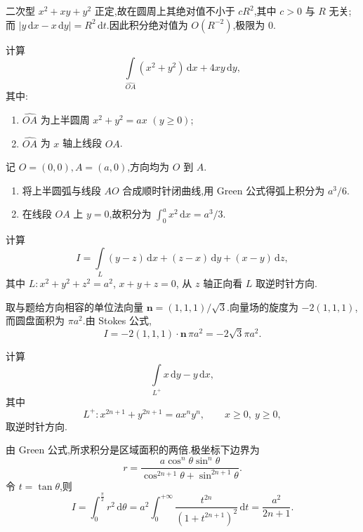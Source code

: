 \begin{solution}
    二次型 $x^2+xy+y^2$ 正定,故在圆周上其绝对值不小于 $cR^2$,其中 $c>0$ 与 $R$ 无关;而 $|y\,\mathrm{d}x-x\,\mathrm{d}y|=R^2\,\mathrm{d}t$.因此积分绝对值为 $O(R^{-2})$,极限为 $0$.
\end{solution}

\begin{example}
    计算
    \[
        \int\limits_{\widehat{OA}}(x^2+y^2)\,\mathrm{d}x+4xy\,\mathrm{d}y,
    \]
    其中:
    \begin{enumerate}
        \item $\widehat{OA}$ 为上半圆周 $x^2+y^2=ax$ $(y\geq0)$;
        \item $\widehat{OA}$ 为 $x$ 轴上线段 $OA$.
    \end{enumerate}
\end{example}
\exampleblank

\begin{solution}
    记 $O=(0,0),A=(a,0)$,方向均为 $O$ 到 $A$.
    \begin{enumerate}
        \item 将上半圆弧与线段 $AO$ 合成顺时针闭曲线,用 Green 公式得弧上积分为 $a^3/6$.
        \item 在线段 $OA$ 上 $y=0$,故积分为 $\int_0^ax^2\,\mathrm{d}x=a^3/3$.
    \end{enumerate}
\end{solution}

\begin{example}
    计算
    \[
        I=\int\limits_L(y-z)\,\mathrm{d}x+(z-x)\,\mathrm{d}y+(x-y)\,\mathrm{d}z,
    \]
    其中 $L:x^2+y^2+z^2=a^2$, $x+y+z=0$, 从 $z$ 轴正向看 $L$ 取逆时针方向.
\end{example}
\exampleblank

\begin{solution}
    取与题给方向相容的单位法向量 $\bm n=(1,1,1)/\sqrt{3}$.向量场的旋度为 $-2(1,1,1)$,而圆盘面积为 $\pi a^2$.由 Stokes 公式,
    \[
        I=-2(1,1,1)\cdot\bm n\,\pi a^2=-2\sqrt{3}\pi a^2.
    \]
\end{solution}

\begin{example}
    计算
    \[
        \int\limits_{L^+}x\,\mathrm{d}y-y\,\mathrm{d}x,
    \]
    其中
    \[
        L^+:x^{2n+1}+y^{2n+1}=ax^ny^n,\qquad x\geq0,\ y\geq0,
    \]
    取逆时针方向.
\end{example}
\exampleblank

\begin{solution}
    由 Green 公式,所求积分是区域面积的两倍.极坐标下边界为
    \[
        r=\dfrac{a\cos^n\theta\sin^n\theta}{\cos^{2n+1}\theta+\sin^{2n+1}\theta}.
    \]
    令 $t=\tan\theta$,则
    \[
        I=\int_0^{\frac{\pi}{2}}r^2\,\mathrm{d}\theta
        =a^2\int_0^{+\infty}\dfrac{t^{2n}}{(1+t^{2n+1})^2}\,\mathrm{d}t
        =\dfrac{a^2}{2n+1}.
    \]
\end{solution}



